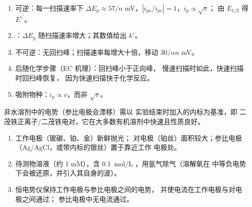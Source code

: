 \begin{method}[诊断伏安图]\label{met:b3:electrode-kinetics:cv-diagnosis}
\begin{enumerate}
  \item 可逆：每一扫描速率下 $\Delta E_{\mathrm p} \approx 57/n$ mV，$|i_{\mathrm{pa}}/i_{\mathrm{pc}}| = 1$，$i_{\mathrm p} \propto \sqrt v$；
        由 $E_{1/2}$ 得 $E^{\circ\prime}$。
  \item {}：$\Delta E_{\mathrm p}$ 随扫描速率增大；其数值给出 $k^\circ$。
  \item 不可逆：无回扫峰；扫描速率每增大十倍，移动
        $30/\alpha n$ mV。
  \item 后随化学步骤（EC 机理）：回扫峰小于正向峰，
        慢速扫描时如此，快速扫描时回扫峰恢复，
        因为快速扫描快于化学反应。
  \item 吸附物种：$i_{\mathrm p} \propto v$，而非 $\sqrt v$。
\end{enumerate}
\end{method}

非水溶剂中的电势（参比电极会漂移）需以
实验结束时加入的内标为基准，即
二茂铁正离子/二茂铁电对，它在大多数有机溶剂中快速且性质良好。

\begin{method}[搭建三电极测量]\label{met:b3:electrode-kinetics:three-electrode}
\begin{enumerate}
  \item 工作电极（玻碳、铂、金）新鲜抛光；
        对电极（铂丝）面积较大；参比电极
        （Ag/AgCl，或带内标的银丝）置于靠近工作
        电极处。
  \item 待测物溶液（约 1 mM），含 \qty{0.1}{mol/L} ，用氩气除气（溶解氧在
        中等负电势下会被还原，并引入其自身的波）。
  \item 恒电势仪保持工作电极与参比电极之间的电势，
        并使电流在工作电极与对电极之间通过；
        参比电极中无电流通过。
\end{enumerate}
\end{method}

